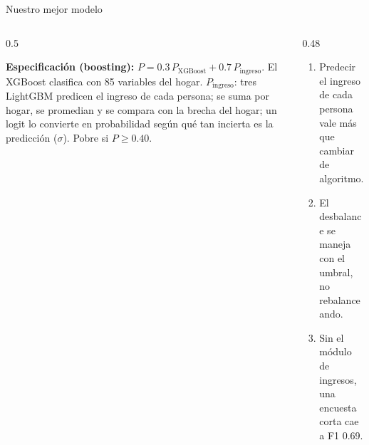 \begin{frame}{Nuestro mejor modelo}
\vspace{-0.3em}
\begin{center}
\resizebox{0.76\linewidth}{!}{}
\end{center}
\vspace{-0.4em}
\begin{columns}[T]
\begin{column}{0.5\textwidth}
{\scriptsize\textbf{Especificación (boosting):} $P = 0.3\,P_{\text{XGBoost}} + 0.7\,P_{\text{ingreso}}$. El XGBoost clasifica con 85 variables del hogar. $P_{\text{ingreso}}$: tres LightGBM predicen el ingreso de cada persona; se suma por hogar, se promedian y se compara con la brecha del hogar; un logit lo convierte en probabilidad según qué tan incierta es la predicción ($\sigma$). Pobre si $P \geq 0.40$.\par}
\end{column}
\begin{column}{0.48\textwidth}
\centering
{}\hspace{1em}\hspace{1em}
\par\vspace{0.3em}\raggedright
{\scriptsize
\begin{enumerate}\setlength\itemsep{0em}
\item \alert{Predecir el ingreso de cada persona} vale más que cambiar de algoritmo.
\item El desbalance se maneja con el \alert{umbral}, no rebalanceando.
\item Sin el módulo de ingresos, una encuesta corta cae a \alert{F1 0.69}.
\end{enumerate}}
\end{column}
\end{columns}
\end{frame}

